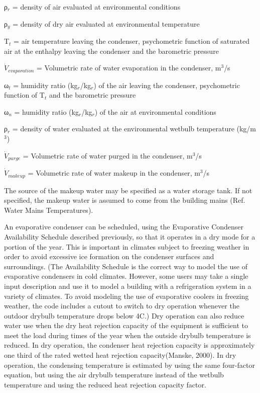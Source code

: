 ρ\(_{r}\) = density of air evaluated at environmental conditions

ρ\(_{y}\) = density of dry air evaluated at environmental temperature

T\(_{t}\) = air temperature leaving the condenser, psychometric function of saturated air at the enthalpy leaving the condenser and the barometric pressure

\({\dot V_{evaporation}}\) = Volumetric rate of water evaporation in the condenser, m\(^{3}\)/s

ω\(_{t}\) = humidity ratio (kg\(_{r}\)/kg\(_{r}\)) of the air leaving the condenser, psychometric function of T\(_{t}\) and the barometric pressure

ω\(_{n}\) = humidity ratio (kg\(_{r}\)/kg\(_{r}\)) of the air at environmental conditions

ρ\(_{r}\) = density of water evaluated at the environmental wetbulb temperature (kg/m\(^{3}\))

\({\dot V_{purge}}\) = Volumetric rate of water purged in the condenser, m\(^{3}\)/s

\({\dot V_{makeup}}\) = Volumetric rate of water makeup in the condenser, m\(^{3}\)/s

The source of the makeup water may be specified as a water storage tank. If not specified, the makeup water is assumed to come from the building mains (Ref. Water Mains Temperatures).

An evaporative condenser can be scheduled, using the Evaporative Condenser Availability Schedule described previously, so that it operates in a dry mode for a portion of the year. This is important in climates subject to freezing weather in order to avoid excessive ice formation on the condenser surfaces and surroundings. (The Availability Schedule is the correct way to model the use of evaporative condensers in cold climates. However, some users may take a single input description and use it to model a building with a refrigeration system in a variety of climates. To avoid modeling the use of evaporative coolers in freezing weather, the code includes a cutout to switch to dry operation whenever the outdoor drybulb temperature drops below 4C.) Dry operation can also reduce water use when the dry heat rejection capacity of the equipment is sufficient to meet the load during times of the year when the outside drybulb temperature is reduced. In dry operation, the condenser heat rejection capacity is approximately one third of the rated wetted heat rejection capacity(Manske, 2000). In dry operation, the condensing temperature is estimated by using the same four-factor equation, but using the air drybulb temperature instead of the wetbulb temperature and using the reduced heat rejection capacity factor.

